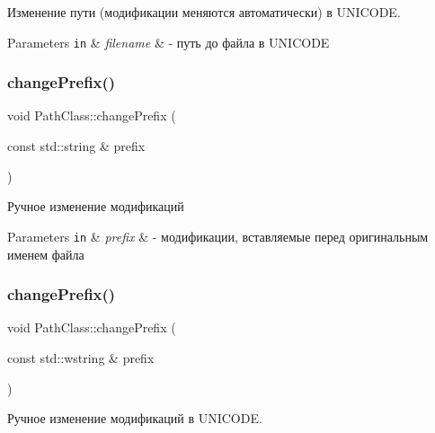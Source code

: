 Изменение пути (модификации меняются автоматически) в U\+N\+I\+C\+O\+DE. 


\begin{DoxyParams}[1]{Parameters}
\mbox{\tt in}  & {\em filename} & -\/ путь до файла в U\+N\+I\+C\+O\+DE \\
\hline
\end{DoxyParams}
\mbox{\label{class_path_class_a2ca417e8d9cc0e071470b00681a834d8}} 
\subsubsection{\texorpdfstring{change\+Prefix()}{changePrefix()}\hspace{0.1cm}{\footnotesize\ttfamily [1/2]}}
{\footnotesize\ttfamily void Path\+Class\+::change\+Prefix (\begin{DoxyParamCaption}\item[{const std\+::string \&}]{prefix }\end{DoxyParamCaption})}



Ручное изменение модификаций 


\begin{DoxyParams}[1]{Parameters}
\mbox{\tt in}  & {\em prefix} & -\/ модификации, вставляемые перед оригинальным именем файла \\
\hline
\end{DoxyParams}
\mbox{\label{class_path_class_a078c9eafbd2ef04faa7df37fde842cb8}} 
\subsubsection{\texorpdfstring{change\+Prefix()}{changePrefix()}\hspace{0.1cm}{\footnotesize\ttfamily [2/2]}}
{\footnotesize\ttfamily void Path\+Class\+::change\+Prefix (\begin{DoxyParamCaption}\item[{const std\+::wstring \&}]{prefix }\end{DoxyParamCaption})}



Ручное изменение модификаций в U\+N\+I\+C\+O\+DE. 


